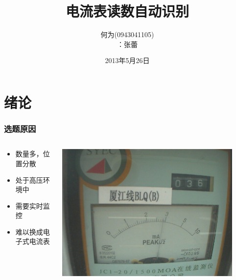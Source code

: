 \documentclass[12pt,hyperref={CJKbookmarks=true}]{beamer}
\begin{document}
\title{电流表读数自动识别}
\author[何为]{何为(0943041105)\\[10pt] ：张蕾}
\date{2013年5月26日}
\logo{\tiny\LaTeX}

\begin{frame}
  \titlepage
\end{frame}

\section{绪论}

\begin{frame}
  \frametitle{选题原因}
  \begin{columns}[onlytextwidth]
    \begin{column}{0.6\textwidth}
      \begin{itemize}
      \item 数量多，位置分散
      \item 处于高压环境中
      \item 需要实时监控
      \item 难以换成电子式电流表
      \end{itemize}
    \end{column}
    \begin{column}{0.4\textwidth}
      \centering
      \includegraphics[width=0.9\textwidth]{src.png}
    \end{column}
  \end{columns}
\end{frame}
\end{document}
